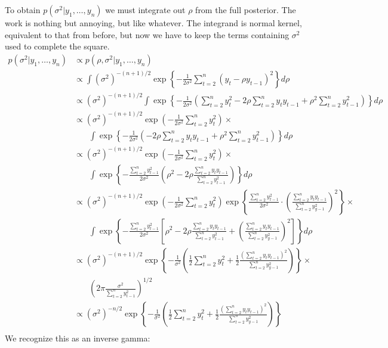 \documentclass[12pt]{article}
\begin{document}
\noindent To obtain $p(\sigma^2|y_1,\ldots,y_n)$ we must integrate out $\rho$ from the full posterior. The work is nothing but annoying, but like whatever. The integrand is normal kernel, equivalent to that from before, but now we have to keep the terms containing $\sigma^2$ used to complete the square.
\begin{align*}
p(\sigma^2|y_1,\ldots,y_n) &\propto p(\rho,\sigma^2|y_1,\ldots,y_n) \\
&\propto \int (\sigma^2)^{-(n+1)/2} \exp\left\{-\frac{1}{2\sigma^2}\sum_{t=2}^n(y_t-\rho y_{t-1})^2\right\} d\rho \\
&\propto (\sigma^2)^{-(n+1)/2} \int \exp\left\{-\frac{1}{2\sigma^2}\left(\sum_{t=2}^ny_t^2 - 2\rho\sum_{t=2}^ny_t y_{t-1}+\rho^2\sum_{t=2}^ny_{t-1}^2\right)\right\} d\rho \\
&\propto (\sigma^2)^{-(n+1)/2}\exp\left(-\frac{1}{2\sigma^2}\sum_{t=2}^ny_t^2\right) \times \\
& ~~~~ ~~~~ \int \exp\left\{-\frac{1}{2\sigma^2}\left(- 2\rho\sum_{t=2}^ny_t y_{t-1}+\rho^2\sum_{t=2}^ny_{t-1}^2\right)\right\} d\rho \\
&\propto (\sigma^2)^{-(n+1)/2}\exp\left(-\frac{1}{2\sigma^2}\sum_{t=2}^ny_t^2\right) \times \\
& ~~~~ ~~~~ \int \exp\left\{-\frac{\sum_{t=2}^ny_{t-1}^2}{2\sigma^2}\left(\rho^2- 2\rho\frac{\sum_{t=2}^ny_t y_{t-1}}{\sum_{t=2}^ny_{t-1}^2}\right)\right\} d\rho \\
&\propto (\sigma^2)^{-(n+1)/2}\exp\left(-\frac{1}{2\sigma^2}\sum_{t=2}^ny_t^2\right)\exp\left\{\frac{\sum_{t=2}^ny_{t-1}^2}{2\sigma^2}\cdot\left(\frac{\sum_{t=2}^ny_t y_{t-1}}{\sum_{t=2}^ny_{y-1}^2}\right)^2\right\}  \times \\
& ~~~~ ~~~~ \int \exp\left\{-\frac{\sum_{t=2}^ny_{t-1}^2}{2\sigma^2}\left[\rho^2- 2\rho\frac{\sum_{t=2}^ny_t y_{t-1}}{\sum_{t=2}^ny_{t-1}^2}+\left(\frac{\sum_{t=2}^ny_t y_{t-1}}{\sum_{t=2}^ny_{y-1}^2}\right)^2\right]\right\} d\rho \\
&\propto (\sigma^2)^{-(n+1)/2}\exp\left\{-\frac{1}{\sigma^2}\left(\frac{1}{2}\sum_{t=2}^ny_t^2 +\frac{1}{2}\frac{(\sum_{t=2}^ny_t y_{t-1})^2}{\sum_{t=2}^ny_{y-1}^2}\right)\right\}  \times \\
& ~~~~ ~~~~ \left(2\pi\frac{\sigma^2}{\sum_{t=2}^ny_{t-1}^2}\right)^{1/2} \\
&\propto (\sigma^2)^{-n/2}\exp\left\{-\frac{1}{\sigma^2}\left(\frac{1}{2}\sum_{t=2}^ny_t^2 +\frac{1}{2}\frac{(\sum_{t=2}^ny_t y_{t-1})^2}{\sum_{t=2}^ny_{y-1}^2}\right)\right\} \\
\end{align*}
\noindent We recognize this as an inverse gamma:
\end{document}

